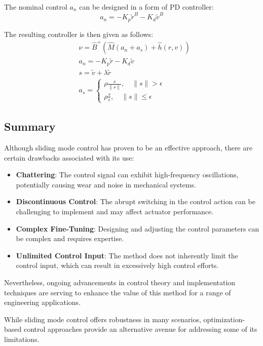     The nominal control $a_n$ can be 
    designed in a form of PD controller:
    \begin{equation}
        a_n = - K_p\tilde{r}^B - K_d\tilde{v}^B
    \end{equation}

    The resulting controller is then given as follows:
    \begin{align} 
        &\nu = \hat{B}^{+}(\hat{M}(a_n + a_s) + \hat h(r, v))
        \label{eqn::sliding_mode} \\
        &a_n = - K_p\tilde{r} - K_d\tilde{v} \\
        &s = \tilde{v} + \lambda \tilde{r} \\
        &a_s = 
        \begin{cases}
        \rho \frac{s}{\|s\|}, \quad \|s\| >\epsilon\\
        \rho \frac{s}{\epsilon}, \quad \|s\| \leq\epsilon
        \end{cases}
    \end{align}

    \subsection{Summary}

    Although sliding mode control has proven to be an effective approach, there are certain drawbacks associated with its use:
    \begin{itemize}
        \item \textbf{Chattering}: The control signal can exhibit high-frequency oscillations, potentially causing wear and noise in mechanical systems.
        \item \textbf{Discontinuous Control}: The abrupt switching in the control action can be challenging to implement and may affect actuator performance.
        \item \textbf{Complex Fine-Tuning}: Designing and adjusting the control parameters can be complex and requires expertise.
        \item \textbf{Unlimited Control Input}: The method does not inherently limit the control input, which can result in excessively high control efforts.
    \end{itemize}
    Nevertheless, ongoing advancements in control theory and implementation techniques are serving to enhance the value of this method for a range of engineering applications.
        
    While sliding mode control offers robustness in many scenarios, 
    optimization-based control approaches provide an alternative avenue 
    for addressing some of its limitations.

